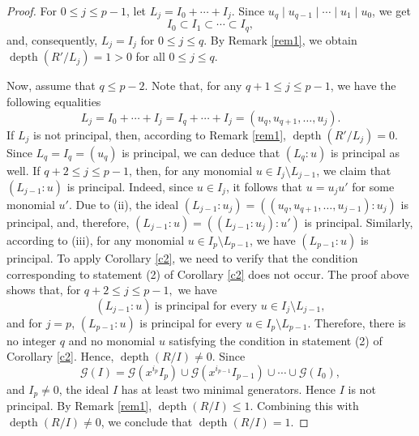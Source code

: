 \documentclass[10pt,a4paper]{amsart}
\def\depth{\operatorname{depth}}
\begin{document}
\begin{proof}
For $0\leq j\leq p-1$, let $L_j=I_0+\cdots+I_j$. Since $u_q\mid u_{q-1} \mid  \cdots \mid u_1 \mid u_0$, we get
$$I_0\subset I_1 \subset \cdots \subset I_q,$$
and, consequently, $L_j=I_j$ for $0\leq j\leq q$. By Remark \ref{rem1}, we obtain $\depth(R'/L_j)=1>0$ for all $0\leq j\leq q$.

Now, assume that $q\leq p-2$. Note that, for any $q+1\leq j\leq p-1$, we have the following equalities 
$$L_j=I_0+\cdots+I_j=I_q+\cdots+I_j=(u_q,u_{q+1},\ldots,u_j).$$ 
If $L_j$ is not principal, then, according to Remark \ref{rem1}, $\depth(R'/L_j)=0$. 
Since $L_q = I_q = (u_q)$  is  principal, we can deduce that $(L_q:u)$ is principal as well. 
If $q+2\leq j\leq p-1$,   then, for any monomial $u\in I_{j}\setminus L_{j-1}$, we claim that
$(L_{j-1}:u)$ is principal. Indeed, since $u\in I_{j}$, it follows that $u=u_{j}u'$ for some monomial $u'$.
Due to  (ii), the ideal $(L_{j-1}:u_{j}) = ((u_{q},u_{q+1},\ldots,u_{j-1}):u_j)$ is principal, 
and, therefore, $(L_{j-1}:u)=((L_{j-1}:u_j):u')$ is principal.
Similarly, according to (iii), for any monomial $u\in I_p\setminus L_{p-1}$, we have  $(L_{p-1}:u)$ is principal.
To apply Corollary \ref{c2}, we need to verify that the condition
corresponding to statement {\rm (2)} of Corollary \ref{c2} does not occur.
 The proof above shows that, for $q+2\leq j\leq p-1,$ we have
\[
(L_{j-1}:u)\ \text{is principal for every }u\in I_{j}\setminus L_{j-1},
\]
and  for \(j=p\), $(L_{p-1}:u)$ is principal for every $u\in I_p\setminus L_{p-1}.$ 
Therefore, there is no integer \(q\) and no monomial \(u\) satisfying the
condition in statement {\rm (2)} of Corollary \ref{c2}. Hence, $\depth(R/I)\neq 0.$ 
Since $$\mathcal{G}(I)=\mathcal{G}(x^{i_p}I_p)\cup
\mathcal{G}(x^{i_{p-1}}I_{p-1})\cup\cdots\cup\mathcal{G}(I_0),$$
and \(I_p\neq 0\), the ideal \(I\) has at least two minimal generators.
Hence \(I\) is not principal. By Remark \ref{rem1},
 $\depth(R/I)\leq 1.$ Combining this with \(\depth(R/I)\neq0\), we conclude that
$\depth(R/I)=1.$
\end{proof}
\end{document}
